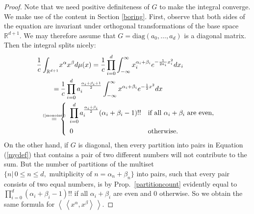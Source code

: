 \documentclass{amsart}
\newcommand{\bra}{\left<\!\!\!\:\left<}
\newcommand{\ket}{\right>\!\!\!\:\right>}
\newcommand{\myeq}[1]{\mathrel{\overset{\makebox[0pt]{\text{\tiny #1}}}{=}}}
\newcommand{\R}{\mathbb{R}}
\theoremstyle{plain}
\theoremstyle{definition}
\theoremstyle{remark}
\begin{document}
\begin{proof} Note that we need positive definiteness of $G$ to make the integral converge. We make use of the content in Section \ref{boring}.
First, observe that both sides of the equation are invariant under orthogonal transformations of the base space $\R^{d+1}$. We may therefore assume that $G= \text{diag}\left(a_0,\ldots,a_d\right)$ is a diagonal matrix. Then the integral splits nicely:
\begin{align*}
\frac{1}{c}\int_{\R^{d+1}}& x^\alpha x^\beta d\mu(x)= \frac{1}{c}\prod_{i=0}^d \int_{-\infty}^\infty x_i^{\alpha_i+\beta_i} e^{-\frac{1}{2a_i}x_i^2}dx_i \\=&\: 
\frac{1}{c}\prod_{i=0}^d a_i^{\frac{\alpha_i+\beta_i+1}{2}}\int_{-\infty}^\infty x^{\alpha_i+\beta_i} e^{-\frac{1}{2}x^2}dx\\
\myeq{(\ref{monoint})}\  &\left\{
\begin{array}{*2{l}p{5cm}}\displaystyle \prod_{i=0}^d a_i^{\frac{\alpha_i+\beta_i}{2}}(\alpha_i+\beta_i-1)!! &\text{if all }\alpha_i+\beta_i\text{ are even}, \vspace{0.2cm} \\ 
 0 &\text{otherwise}.
\end{array}
 \right.
\end{align*}
On the other hand, if $G$ is diagonal, then every partition into pairs in Equation (\ref{mydef}) that contains a pair of two different numbers will not contribute to the sum. But the number of partitions of the multiset $\{n|\,0\!\leq\!n\!\leq\! d,\text{ multiplicity of } n = \alpha_n+\beta_n\}$ into pairs, such that every pair consists of two equal numbers, is by Prop.~\ref{partitioncount} evidently equal to $\prod_{i=0}^d (\alpha_i+\beta_i-1)!!$ if all $\alpha_i+\beta_i$ are even and $0$ otherwise. So we obtain the same formula for $\bra x^\alpha ,x^\beta\ket$.
\end{proof}
\end{document}
